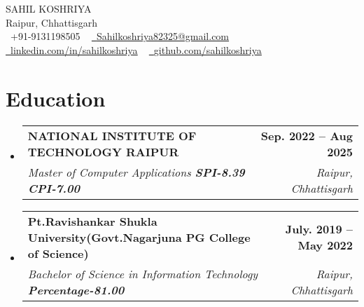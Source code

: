 \documentclass[letterpaper,11pt]{article}
\makeatletter
\newcommand{\resumeSubheading}[4]{
  \vspace{-2pt}\item
    \begin{tabular*}{1.0\textwidth}[t]{l@{\extracolsep{\fill}}r}
      \textbf{#1} & \textbf{\small #2} \\
      \textit{\small#3} & \textit{\small #4} \\
    \end{tabular*}\vspace{-7pt}
}
\newcommand{\resumeSubHeadingListStart}{\begin{itemize}[leftmargin=0.0in, label={}]}
\newcommand{\resumeSubHeadingListEnd}{\end{itemize}}
\makeatother
\begin{document}

\begin{center}
    {\Huge \scshape SAHIL KOSHRIYA} \\ \vspace{1pt}
    Raipur, Chhattisgarh \\ \vspace{1pt}
    \small \raisebox{-0.1\height}\faPhone\ +91-9131198505 ~ \href{mailto:Sahilkoshriya82325@gmail.com}{\raisebox{-0.2\height}\faEnvelope\  \underline{Sahilkoshriya82325@gmail.com}} ~ 
    \href{https://www.linkedin.com/in/sahil-koshriya-1b1a9018b/}{\raisebox{-0.2\height}\faLinkedin\ \underline{linkedin.com/in/sahilkoshriya}}  ~
    \href{https://github.com/SAHILKOSHRIYA}{\raisebox{-0.2\height}\faGithub\ \underline{github.com/sahilkoshriya}}
    \vspace{-8pt}
\end{center}


\section{Education}
  \resumeSubHeadingListStart
    \resumeSubheading
      {NATIONAL INSTITUTE OF TECHNOLOGY RAIPUR}{Sep. 2022 -- Aug 2025}
      {Master of Computer Applications \textbf{SPI-8.39 CPI-7.00} }{Raipur, Chhattisgarh} 
       \resumeSubheading
      {Pt.Ravishankar Shukla University(Govt.Nagarjuna PG College of Science)}{July. 2019 -- May 2022}
      {Bachelor of Science in Information Technology \textbf{Percentage-81.00}}{Raipur, Chhattisgarh}
  \resumeSubHeadingListEnd

\end{document}
